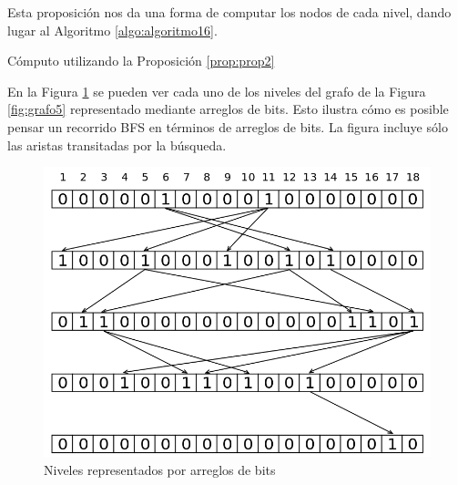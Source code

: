 Esta proposición nos da una forma de computar los nodos de cada nivel, dando lugar al Algoritmo \ref{algo:algoritmo16}. 

\begin{algorithm}
	\dontprintsemicolon
 	\BlankLine
\caption{Cómputo utilizando la Proposición \ref{prop:prop2}}
\label{algo:algoritmo16}
\end{algorithm}

En la Figura \ref{fig:arreglos_niveles} se pueden ver cada uno de los niveles del grafo de la Figura \ref{fig:grafo5} representado mediante arreglos de bits. Esto ilustra cómo es posible pensar un recorrido BFS en términos de arreglos de bits. La figura incluye sólo las aristas transitadas por la búsqueda.

\begin{figure}[h]
\centering
\includegraphics[scale=0.3]{imagenes/bfs.png}
\caption{Niveles representados por arreglos de bits}
\label{fig:arreglos_niveles}
\end{figure}

